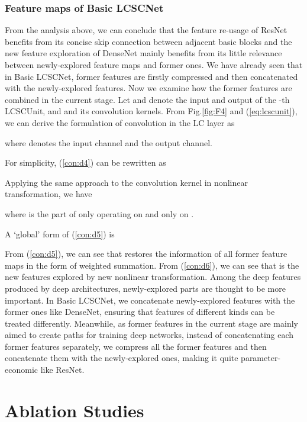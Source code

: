 \documentclass[journal]{IEEEtran}
\begin{document}
\subsubsection{Feature maps of Basic LCSCNet} 

From the analysis above, we can conclude that the feature re-usage of ResNet benefits from its concise skip connection between adjacent basic blocks and the new feature exploration of DenseNet mainly benefits from its little relevance between newly-explored feature maps and former ones. We have already seen that in Basic LCSCNet, former features are firstly compressed and then concatenated with the newly-explored features. Now we examine how the former features are combined in the current stage. Let  and  denote the input and output of the -th LCSCUnit, and  and  its convolution kernels. From Fig.\ref{fig:F4} and (\ref{eq:lcscunit}), we can derive the formulation of  convolution in the LC layer as   

where  denotes the input channel and  the output channel.

For simplicity, (\ref{con:d4}) can be rewritten as
    

Applying the same approach to the convolution kernel  in nonlinear transformation, we have

where  is the part of  only operating on  and  only on .

A `global' form of (\ref{con:d5}) is 


From (\ref{con:d5}), we can see that  restores the information of all former feature maps in the form of weighted summation. From (\ref{con:d6}), we can see that  is the new features explored by new nonlinear transformation. Among the deep features produced by deep architectures, newly-explored parts are thought to be more important. In Basic LCSCNet, we concatenate newly-explored features with the former ones like DenseNet, ensuring that features of different kinds can be treated differently. Meanwhile, as former features in the current stage are mainly aimed to create paths for training deep networks, instead of concatenating each former features separately, we compress all the former features and then concatenate them with the newly-explored ones, making it quite parameter-economic like ResNet.  





\section{Ablation Studies}\label{s:s_5}
\end{document}
